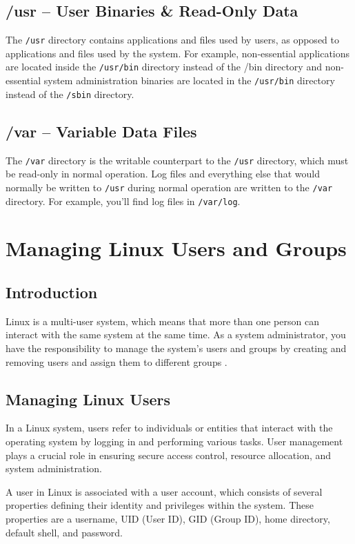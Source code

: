 \documentclass{article}
\begin{document}
\subsection{/usr -- User Binaries \& Read-Only Data}
The \verb|/usr| directory contains applications and files used by users, as opposed to applications and files used by the system. For example, non-essential applications are located inside the \verb|/usr/bin| directory instead of the /bin directory and non-essential system administration binaries are located in the \verb|/usr/bin| directory instead of the \verb|/sbin| directory.

\subsection{/var -- Variable Data Files}
The \verb|/var| directory is the writable counterpart to the \verb|/usr| directory, which must be read-only in normal operation. Log files and everything else that would normally be written to \verb|/usr| during normal operation are written to the \verb|/var| directory. For example, you'll find log files in \verb|/var/log|.

\newpage
\section{Managing Linux Users and Groups}

\subsection{Introduction}
Linux is a multi-user system, which means that more than one person can interact with the same system at the same time. As a system administrator, you have the responsibility to manage the system’s users and groups by creating and removing users and assign them to different groups .

\subsection{Managing Linux Users}
In a Linux system, users refer to individuals or entities that interact with the operating system by logging in and performing various tasks. User management plays a crucial role in ensuring secure access control, resource allocation, and system administration.

A user in Linux is associated with a user account, which consists of several properties defining their identity and privileges within the system. These properties are a username, UID (User ID), GID (Group ID), home directory, default shell, and password.
\end{document}
